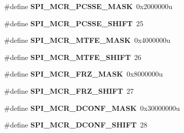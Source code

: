 \begin{DoxyCompactItemize}
\item 
\hypertarget{group___s_p_i___register___masks_ga479a7a3131d4356e53f7f86bd4cd0245}{}\#define {\bfseries S\+P\+I\+\_\+\+M\+C\+R\+\_\+\+P\+C\+S\+S\+E\+\_\+\+M\+A\+S\+K}~0x2000000u\label{group___s_p_i___register___masks_ga479a7a3131d4356e53f7f86bd4cd0245}

\item 
\hypertarget{group___s_p_i___register___masks_ga4dc49f49441cc797619c160757bd7d2d}{}\#define {\bfseries S\+P\+I\+\_\+\+M\+C\+R\+\_\+\+P\+C\+S\+S\+E\+\_\+\+S\+H\+I\+F\+T}~25\label{group___s_p_i___register___masks_ga4dc49f49441cc797619c160757bd7d2d}

\item 
\hypertarget{group___s_p_i___register___masks_ga3fa9d02b4302f9963c26383bdeb35da8}{}\#define {\bfseries S\+P\+I\+\_\+\+M\+C\+R\+\_\+\+M\+T\+F\+E\+\_\+\+M\+A\+S\+K}~0x4000000u\label{group___s_p_i___register___masks_ga3fa9d02b4302f9963c26383bdeb35da8}

\item 
\hypertarget{group___s_p_i___register___masks_gaaff9ea9fcaf46dc8bfd358d941e0d3ac}{}\#define {\bfseries S\+P\+I\+\_\+\+M\+C\+R\+\_\+\+M\+T\+F\+E\+\_\+\+S\+H\+I\+F\+T}~26\label{group___s_p_i___register___masks_gaaff9ea9fcaf46dc8bfd358d941e0d3ac}

\item 
\hypertarget{group___s_p_i___register___masks_ga6d4131c2e45352910d630723c1172d2c}{}\#define {\bfseries S\+P\+I\+\_\+\+M\+C\+R\+\_\+\+F\+R\+Z\+\_\+\+M\+A\+S\+K}~0x8000000u\label{group___s_p_i___register___masks_ga6d4131c2e45352910d630723c1172d2c}

\item 
\hypertarget{group___s_p_i___register___masks_ga7500a54a21171d20a3bbf0355350c9bd}{}\#define {\bfseries S\+P\+I\+\_\+\+M\+C\+R\+\_\+\+F\+R\+Z\+\_\+\+S\+H\+I\+F\+T}~27\label{group___s_p_i___register___masks_ga7500a54a21171d20a3bbf0355350c9bd}

\item 
\hypertarget{group___s_p_i___register___masks_gab6f80a07ce3be21ee0de56c3de90f380}{}\#define {\bfseries S\+P\+I\+\_\+\+M\+C\+R\+\_\+\+D\+C\+O\+N\+F\+\_\+\+M\+A\+S\+K}~0x30000000u\label{group___s_p_i___register___masks_gab6f80a07ce3be21ee0de56c3de90f380}

\item 
\hypertarget{group___s_p_i___register___masks_ga5f84d391d6b5838c50b44217617d66a8}{}\#define {\bfseries S\+P\+I\+\_\+\+M\+C\+R\+\_\+\+D\+C\+O\+N\+F\+\_\+\+S\+H\+I\+F\+T}~28\label{group___s_p_i___register___masks_ga5f84d391d6b5838c50b44217617d66a8}


\end{DoxyCompactItemize}
